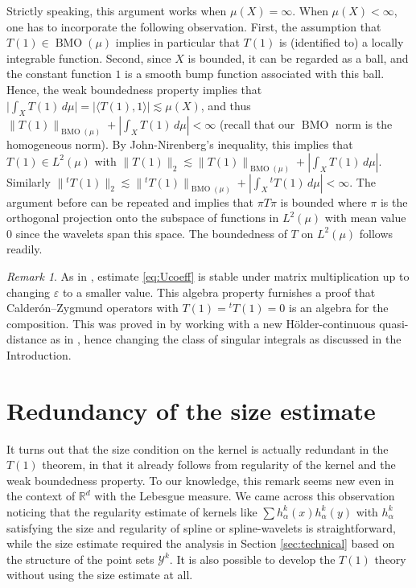 \documentclass{amsart}
\numberwithin{equation}{section}
\theoremstyle{plain}
\theoremstyle{definition}
\theoremstyle{remark}
\newtheorem{remark}[equation]{Remark}
\begin{document}
{{{Strictly speaking, this argument works  when $\mu(X)=\infty$. When $\mu(X)<\infty$,  one has to incorporate the following observation.
 {First, the assumption that $T(1)\in{\operatorname{BMO}}(\mu)$ implies in particular that $T(1) $ is (identified to) a locally integrable function.
Second, since $X$ is bounded, it can be regarded as a ball, and the constant function $1$ is a smooth bump function associated with this ball.
Hence, the weak boundedness property implies that $\vert\int_{X} T(1)\, d\mu\vert =\vert\langle T(1),1\rangle\vert \lesssim \mu(X)$, and thus
 $\|T(1)\|_{{\operatorname{BMO}}(\mu)} +{|{\int_{X} T(1)\, d\mu}|}<\infty$ (recall that our ${\operatorname{BMO}}$ norm is the homogeneous norm).} By John-Nirenberg's inequality, this implies that   $T(1) \in  L^2(\mu)$ with $\|T(1)\|_{2}\lesssim \|T(1)\|_{{\operatorname{BMO}}(\mu)} +{|{\int_{X} T(1)\, d\mu}|}$.  Similarly $\|{}^tT(1)\|_{2}\lesssim  \|{}^tT(1)\|_{{\operatorname{BMO}}(\mu)} +{|{\int_{X} {}^tT(1)\, d\mu}|}<\infty$. The argument before can be repeated and implies  that $\pi T\pi $ is  bounded where $\pi$ is the orthogonal projection onto  the subspace of  functions in $ L^2(\mu)$ with mean value 0 since the wavelets span this space.  The boundedness of $T$ on $L^2(\mu)$ follows readily.  

 
 
\begin{remark}
As in \cite{M2}, estimate \eqref{eq:Ucoeff} is stable under matrix multiplication up to changing $\varepsilon$ to a smaller value. This algebra property furnishes a proof that  Calder\'on--Zygmund operators with $T(1)={}^tT(1)=0$ is an algebra for the composition.  This was proved in \cite{HL} by working with a new  H\"older-continuous quasi-distance as in \cite{DJS}, hence changing the class of singular integrals as discussed in the Introduction.  \end{remark} 

 
 
 
 

 

\section{Redundancy of the size estimate}

It turns out that the size condition on the kernel is actually redundant in the $T(1)$ theorem, in that it already follows from regularity of the kernel and the weak boundedness property. To our knowledge, this remark seems new even in the context of ${\mathbb{R}}^d$ with the Lebesgue measure.
We came across this observation noticing that the regularity estimate of kernels like 
$\sum h^k_{\alpha}(x)h^k_{\alpha}(y)$ with $h^k_{\alpha}$ satisfying the size and regularity of spline or spline-wavelets is straightforward, while the size estimate required the analysis  in Section \ref{sec:technical} 
based on the structure of the point sets $\mathscr{Y}^{k}$. It is also possible to develop the $T(1)$ theory without using the size estimate at all.

}}}
\end{document}
